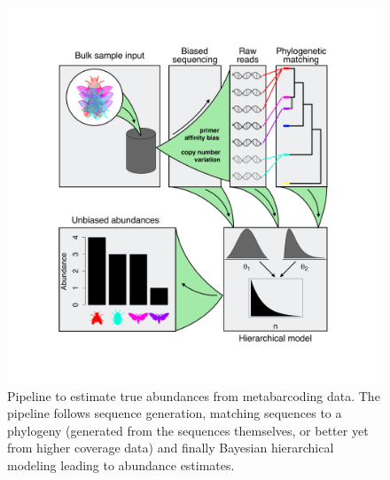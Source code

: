 \documentclass[12pt]{article}
\begin{document}
\begin{figure}[!hbp]
  \centering
  \includegraphics[scale=0.4]{fig_metab.pdf}
  \caption{Pipeline to estimate true abundances from metabarcoding
    data. The pipeline follows sequence generation, matching sequences
    to a phylogeny (generated from the sequences themselves, or better
    yet from higher coverage data) and finally Bayesian hierarchical
    modeling leading to abundance estimates.}
  \label{fig:abundPipeline}
\end{figure}
\end{document}

